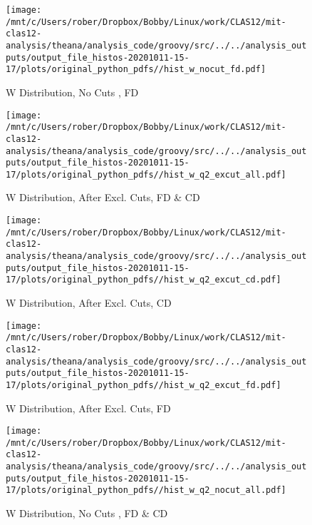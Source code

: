 \documentclass{article}
\begin{document}
\begin{landscape}
    \begin{figure}[h]
        \centering

        \texttt{[image: /mnt/c/Users/rober/Dropbox/Bobby/Linux/work/CLAS12/mit-clas12-analysis/theana/analysis\_code/groovy/src/../../analysis\_outputs/output\_file\_histos-20201011-15-17/plots/original\_python\_pdfs//hist\_w\_nocut\_fd.pdf]}
        \captionsetup{textformat=empty,labelformat=blank}
        \caption{W Distribution, No Cuts , FD}
    \end{figure}
    \clearpage
    
    \begin{figure}[h]
        \centering

        \texttt{[image: /mnt/c/Users/rober/Dropbox/Bobby/Linux/work/CLAS12/mit-clas12-analysis/theana/analysis\_code/groovy/src/../../analysis\_outputs/output\_file\_histos-20201011-15-17/plots/original\_python\_pdfs//hist\_w\_q2\_excut\_all.pdf]}
        \captionsetup{textformat=empty,labelformat=blank}
        \caption{W Distribution, After Excl. Cuts, FD \& CD}
    \end{figure}
    \clearpage
    
    \begin{figure}[h]
        \centering

        \texttt{[image: /mnt/c/Users/rober/Dropbox/Bobby/Linux/work/CLAS12/mit-clas12-analysis/theana/analysis\_code/groovy/src/../../analysis\_outputs/output\_file\_histos-20201011-15-17/plots/original\_python\_pdfs//hist\_w\_q2\_excut\_cd.pdf]}
        \captionsetup{textformat=empty,labelformat=blank}
        \caption{W Distribution, After Excl. Cuts, CD}
    \end{figure}
    \clearpage
    
    \begin{figure}[h]
        \centering

        \texttt{[image: /mnt/c/Users/rober/Dropbox/Bobby/Linux/work/CLAS12/mit-clas12-analysis/theana/analysis\_code/groovy/src/../../analysis\_outputs/output\_file\_histos-20201011-15-17/plots/original\_python\_pdfs//hist\_w\_q2\_excut\_fd.pdf]}
        \captionsetup{textformat=empty,labelformat=blank}
        \caption{W Distribution, After Excl. Cuts, FD}
    \end{figure}
    \clearpage
    
    \begin{figure}[h]
        \centering

        \texttt{[image: /mnt/c/Users/rober/Dropbox/Bobby/Linux/work/CLAS12/mit-clas12-analysis/theana/analysis\_code/groovy/src/../../analysis\_outputs/output\_file\_histos-20201011-15-17/plots/original\_python\_pdfs//hist\_w\_q2\_nocut\_all.pdf]}
        \captionsetup{textformat=empty,labelformat=blank}
        \caption{W Distribution, No Cuts , FD \& CD}
    \end{figure}
    \clearpage
    

\end{landscape}
\end{document}
